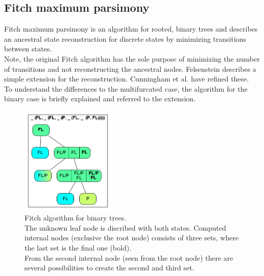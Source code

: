       \subsection{Fitch maximum parsimony}
        Fitch maximum parsimony is an algorithm for rooted, binary trees and describes an ancestral state 
          reconstruction for discrete states \cite{Fitch1971} by minimizing transitions between states. \\
        Note, the original Fitch algorithm has the sole purpose of minimizing the number of transitions 
          and not reconstructing the ancestral nodes. Felsenstein \cite{Felsenstein2003} describes a 
          simple extension for the reconstruction. Cunningham et al. \cite{Cunningham1998} have refined 
          these.   \\
        To understand the differences to the multifurcated case, the algorithm for the binary case is 
          briefly explained and referred to the extension. \\
          \begin{figure}
            \centering
            \includegraphics[width=0.4\textwidth]{Figures/Fitch1.png}
            \caption{Fitch algorithm for binary trees. \\
              The unknown leaf node is discribed with both states. Computed internal nodes (exclusive the 
              root node) consists of three sets, where the last set is the final one (bold). \\
              From the second internal node (seen from the root node) there are several possibilities to 
              create the second and third set.}
            \label{fig: binary Fitch}
          \end{figure}
